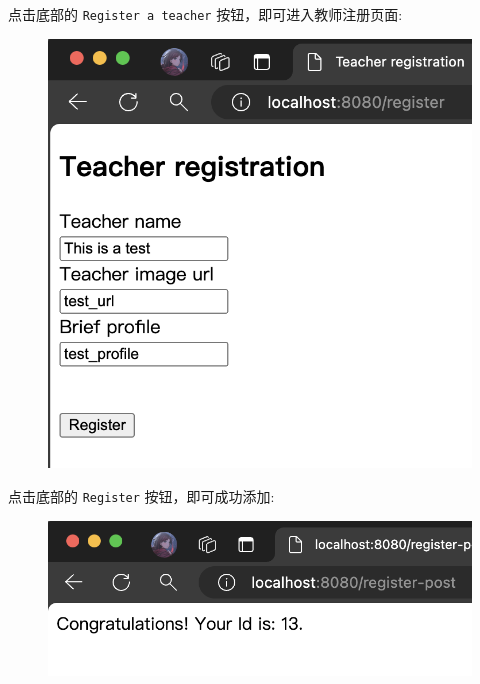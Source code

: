 \documentclass[12pt, oneside]{ctexart}
\numberwithin{figure}{section}
\numberwithin{table}{section}
\begin{document}
点击底部的 \texttt{Register a teacher} 按钮，即可进入教师注册页面:
\begin{figure}[!htbp]
    \centering
    \includegraphics[width=13cm]{images/sec5/Add_Teacher.png}
\end{figure}

点击底部的 \texttt{Register} 按钮，即可成功添加:
\begin{figure}[!htbp]
    \centering
    \includegraphics[width=13cm]{images/sec5/Add_Teacher_Success.png}
\end{figure}
\end{document}
